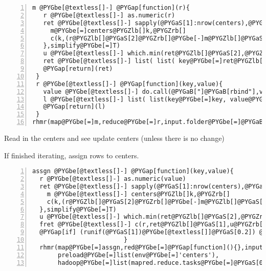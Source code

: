 \documentclass[letterpaper,10pt,english]{manual}
\begin{document}
\begin{Verbatim}[commandchars=@\[\],numbers=left,firstnumber=1,stepnumber=1]
 m @PYGbe[@textless[]-] @PYGap[function](r){
   r @PYGbe[@textless[]-] as.numeric(r)
   ret @PYGbe[@textless[]-] sapply(@PYGaS[1]:nrow(centers),@PYGap[function](k){
     m@PYGbe[=]centers@PYGZlb[]k,@PYGZrb[]
     c(k,(r@PYGZlb[]@PYGaS[2]@PYGZrb[]@PYGbe[-]m@PYGZlb[]@PYGaS[2]@PYGZrb[])@PYGbe[@textasciicircum[]]@PYGaS[2]@PYGbe[+](r@PYGZlb[]@PYGaS[1]@PYGZrb[]@PYGbe[-]m@PYGZlb[]@PYGaS[1]@PYGZrb[])@PYGbe[@textasciicircum[]]@PYGaS[2])
   },simplify@PYGbe[=]T)
   u @PYGbe[@textless[]-] which.min(ret@PYGZlb[]@PYGaS[2],@PYGZrb[])
   ret @PYGbe[@textless[]-] list( list( key@PYGbe[=]ret@PYGZlb[]@PYGaS[1],u@PYGZrb[], value @PYGbe[=] c(r,@PYGaS[1])))
   @PYGap[return](ret)
 }
 r @PYGbe[@textless[]-] @PYGap[function](key,value){
   value @PYGbe[@textless[]-] do.call(@PYGaB["]@PYGaB[rbind"],value)
   l @PYGbe[@textless[]-] list( list(key@PYGbe[=]key, value@PYGbe[=]apply(value,@PYGaS[2],sum)))
   @PYGap[return](l)
 }
rhmr(map@PYGbe[=]m,reduce@PYGbe[=]r,input.folder@PYGbe[=]@PYGaB["]@PYGaB[X"],output.folder@PYGbe[=]@PYGaB["]@PYGaB[Y"],combiner@PYGbe[=]T)
\end{Verbatim}

Read in the centers and see update centers (unless there is no change)

If finished iterating, assign rows to centers.

\begin{Verbatim}[commandchars=@\[\],numbers=left,firstnumber=1,stepnumber=1]
assgn @PYGbe[@textless[]-] @PYGap[function](key,value){
  r @PYGbe[@textless[]-] as.numeric(value)
  ret @PYGbe[@textless[]-] sapply(@PYGaS[1]:nrow(centers),@PYGap[function](k){
    m @PYGbe[@textless[]-] centers@PYGZlb[]k,@PYGZrb[]
    c(k,(r@PYGZlb[]@PYGaS[2]@PYGZrb[]@PYGbe[-]m@PYGZlb[]@PYGaS[2]@PYGZrb[])@PYGbe[@textasciicircum[]]@PYGaS[2]@PYGbe[+](r@PYGZlb[]@PYGaS[1]@PYGZrb[]@PYGbe[-]m@PYGZlb[]@PYGaS[1]@PYGZrb[])@PYGbe[@textasciicircum[]]@PYGaS[2])
  },simplify@PYGbe[=]T)
  u @PYGbe[@textless[]-] which.min(ret@PYGZlb[]@PYGaS[2],@PYGZrb[])
  fret @PYGbe[@textless[]-] c(r,ret@PYGZlb[]@PYGaS[1],u@PYGZrb[])
  @PYGap[if] (runif(@PYGaS[1])@PYGbe[@textless[]]@PYGaS[0.2]) @PYGap[return](list((list(key@PYGbe[=]key,value@PYGbe[=]fret)))
                         }
  rhmr(map@PYGbe[=]assgn,red@PYGbe[=]@PYGap[function](){},input.folder@PYGbe[=]@PYGaB["]@PYGaB[X"],output.folder@PYGbe[=]@PYGaB["]@PYGaB[Y"],
       preload@PYGbe[=]list(env@PYGbe[=]'centers'),
       hadoop@PYGbe[=]list(mapred.reduce.tasks@PYGbe[=]@PYGaS[0]))
\end{Verbatim}
\end{document}
